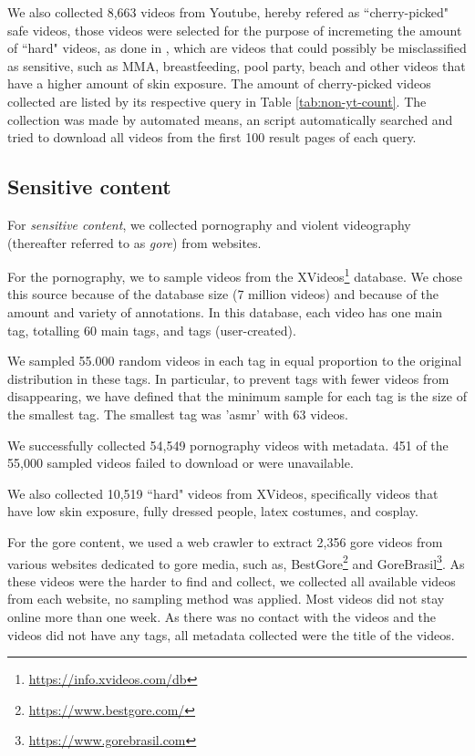 We also collected 8,663 videos from Youtube, hereby refered as ``cherry-picked" safe videos, those videos were selected for the purpose of incremeting the amount of ``hard" videos, as done in \cite{2kdataset}, which are videos that could possibly be misclassified as sensitive, such as MMA, breastfeeding, pool party, beach and other videos that have a higher amount of skin exposure. The amount of cherry-picked videos collected are listed by its respective query in Table \ref{tab:non-yt-count}. The collection was made by automated means, an script automatically searched and tried to download all videos from the first 100 result pages of each query.

\subsection{Sensitive content}\label{subsec:dataset-sensitive}

For \textit{sensitive content}, we collected pornography and violent videography (thereafter referred to as \textit{gore}) from websites. 

For the pornography, we to sample videos from the XVideos\footnote{\url{https://info.xvideos.com/db}} database. We chose this source because of the database size (7 million videos) and because of the amount and variety of annotations. In this database, each video has one main tag, totalling 60 main tags, and tags (user-created). 

We sampled 55.000 random videos in each tag in equal proportion to the original distribution in these tags. In particular, to prevent tags with fewer videos from disappearing, we have defined that the minimum sample for each tag is the size of the smallest tag. The smallest tag was 'asmr' with 63 videos.

We successfully collected 54,549 pornography videos with metadata. 451 of the 55,000 sampled videos failed to download or were unavailable. 

We also collected 10,519 ``hard" videos from XVideos, specifically videos that have low skin exposure, fully dressed people, latex costumes, and cosplay. %

For the gore content, we used a web crawler to extract 2,356 gore videos from various websites dedicated to gore media, such as, BestGore\footnote{\url{https://www.bestgore.com/}} and GoreBrasil\footnote{\url{https://www.gorebrasil.com}}. As these videos were the harder to find and collect, we collected all available videos from each website, no sampling method was applied. Most videos did not stay online more than one week. As there was no contact with the videos and the videos did not have any tags, all metadata collected were the title of the videos. 

